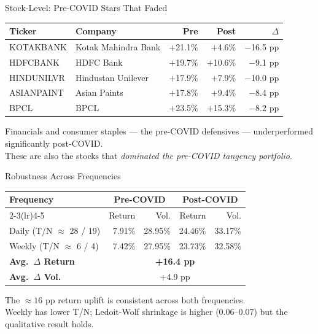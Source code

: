 \documentclass[aspectratio=169]{beamer}
\begin{document}
\begin{frame}{Stock-Level: Pre-COVID Stars That Faded}
  \centering
  \begin{tabular}{llrrr}
    \toprule
    \textbf{Ticker} & \textbf{Company} & \textbf{Pre} & \textbf{Post} & \textbf{$\Delta$} \\
    \midrule
    KOTAKBANK  & Kotak Mahindra Bank & $+$21.1\% & $+$4.6\%  & \textcolor{precovid}{$-$16.5 pp} \\
    HDFCBANK   & HDFC Bank           & $+$19.7\% & $+$10.6\% & \textcolor{precovid}{$-$9.1 pp}  \\
    HINDUNILVR & Hindustan Unilever  & $+$17.9\% & $+$7.9\%  & \textcolor{precovid}{$-$10.0 pp} \\
    ASIANPAINT & Asian Paints        & $+$17.8\% & $+$9.4\%  & \textcolor{precovid}{$-$8.4 pp}  \\
    BPCL       & BPCL                & $+$23.5\% & $+$15.3\% & \textcolor{precovid}{$-$8.2 pp}  \\
    \bottomrule
  \end{tabular}

  \vspace{0.6em}
  \small Financials and consumer staples --- the pre-COVID defensives --- underperformed significantly post-COVID.\\
  These are also the stocks that \emph{dominated the pre-COVID tangency portfolio}.
\end{frame}

\begin{frame}{Robustness Across Frequencies}
  \centering
  \begin{tabular}{lrrrr}
    \toprule
    \textbf{Frequency} & \multicolumn{2}{c}{\textcolor{precovid}{Pre-COVID}} & \multicolumn{2}{c}{\textcolor{postcovid}{Post-COVID}} \\
    \cmidrule(lr){2-3}\cmidrule(lr){4-5}
    & Return & Vol. & Return & Vol. \\
    \midrule
    Daily  \small(T/N $\approx$ 28 / 19)  & 7.91\% & 28.95\% & 24.46\% & 33.17\% \\
    Weekly \small(T/N $\approx$ 6 / 4)    & 7.42\% & 27.95\% & 23.73\% & 32.58\% \\
    \midrule
    \textbf{Avg.\ $\Delta$ Return} & \multicolumn{4}{c}{\textbf{+16.4 pp}} \\
    \textbf{Avg.\ $\Delta$ Vol.}   & \multicolumn{4}{c}{+4.9 pp} \\
    \bottomrule
  \end{tabular}

  \vspace{0.8em}
  The $\approx\!16$ pp return uplift is consistent across both frequencies.\\
  \small Weekly has lower T/N; Ledoit-Wolf shrinkage is higher (0.06--0.07) but the qualitative result holds.
\end{frame}
\end{document}
